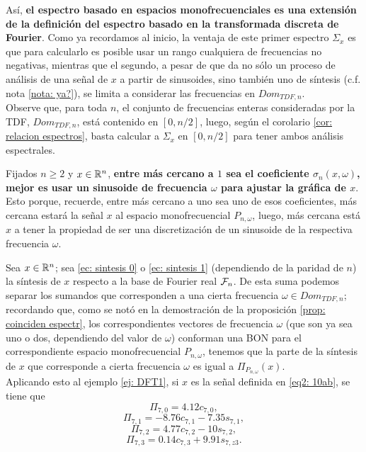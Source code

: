 Así, \textbf{el espectro basado en espacios monofrecuenciales
es una extensión de la definición del espectro 
basado en la transformada discreta de Fourier}.
Como ya recordamos al inicio, la
ventaja de este primer espectro $\Sigma_{x}$
es que para calcularlo es posible usar
un rango cualquiera de frecuencias no negativas, mientras que el segundo, 
a pesar de que da no sólo un proceso de análisis de una señal 
de $x$ a partir de sinusoides, sino también uno de síntesis
(c.f. nota \ref{nota: ya?}), se limita a considerar las frecuencias 
en $Dom_{TDF, n}$. \\

Observe que,
para toda $n$, el conjunto de frecuencias enteras 
consideradas por la TDF, $Dom_{TDF, n}$, está
contenido en $[0, n/2]$, luego, 
según el corolario 
\ref{cor: relacion espectros},
basta calcular 
a $\Sigma_{x}$ en $[0, n/2]$
para tener ambos análisis espectrales.


\begin{nota}
\label{nota: la mejor frecuencia}
Fijados $n \geq 2$
y $x \in \mathbb{R}^{n}$, \textbf{entre más cercano a $1$ sea 
el coeficiente 
$\sigma_{n}(x, \omega)$, mejor es usar un sinusoide
de frecuencia $\omega$ para ajustar la gráfica de $x$}.
Esto porque, recuerde, entre más cercano a uno sea uno de
esos coeficientes, más cercana estará la señal $x$ 
al espacio monofrecuencial $P_{n, \omega}$, luego, más
cercana está $x$
a tener
la propiedad de ser una discretización de un sinusoide
de la respectiva frecuencia $\omega$.
\end{nota}

\begin{nota}
\label{nota: proyeciones monof TDF}
Sea $x \in \mathbb{R}^{n}$; sea 
\eqref{ec: sintesis 0} o 
\eqref{ec: sintesis 1}
(dependiendo de la paridad de $n$)
la síntesis de $x$ respecto a la base de Fourier
real $\mathcal{F}_{n}$. De esta suma podemos
separar los sumandos que corresponden a una
cierta frecuencia $\omega \in Dom_{TDF, n}$; recordando
que, como se notó
en la demostración de la proposición
\ref{prop: coinciden espectr}, 
los correspondientes vectores
de frecuencia $\omega$ (que son ya sea uno o dos, dependiendo del valor
de $\omega$) conforman una BON para el correspondiente
espacio monofrecuencial 
$P_{n, \omega}$, tenemos que la parte de la 
síntesis de $x$ que corresponde a 
cierta frecuencia $\omega$ es igual a
$\Pi_{P_{n, \omega}}(x)$. \\

Aplicando esto al ejemplo \ref{ej: DFT1},
si $x$ es la señal definida en 
\ref{eq2: 10ab}, se tiene que
\[
\Pi_{7, 0} = 4.12 c_{7,0}, 
\]
\[
\Pi_{7, 1} = -8.76 c_{7,1} - 7.35 s_{7,1}, 
\]
\[
\Pi_{7, 2} = 4.77 c_{7,2} - 10 s_{7,2}, 
\]
\[
\Pi_{7, 3} = 0.14 c_{7,3} + 9.91 s_{7,z3}.
\]
\end{nota}



